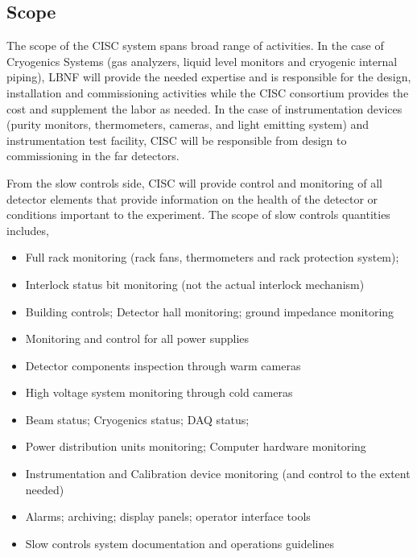 

\subsection{Scope}
\label{sec:fdsp-slow-cryo-scope}


The scope of the CISC system spans broad range of activities. In the
case of Cryogenics Systems (gas analyzers, liquid level monitors and
cryogenic internal piping), LBNF will provide the needed expertise and
is responsible for the design, installation and commissioning activities
while the CISC consortium provides the cost and supplement the labor as
needed. In the case of instrumentation devices (purity monitors,
thermometers, cameras, and light emitting system) and instrumentation
test facility, CISC will be responsible from design to commissioning in
the far detectors.

From the slow controls side, CISC will provide control and monitoring of
all detector elements that provide information on the health of the
detector or conditions important to the experiment. The scope of slow
controls quantities includes,

\begin{itemize}
\item
  Full rack monitoring (rack fans, thermometers and rack protection
  system); 
\item
  Interlock status bit monitoring (not the actual interlock mechanism)
\item
  Building controls; Detector hall monitoring; ground impedance
  monitoring
\item
  Monitoring and control for all power supplies
\item
  Detector components inspection through warm cameras
\item
  High voltage system monitoring through cold cameras
\item
  Beam status; Cryogenics status; DAQ status; 
\item
  Power distribution units monitoring; Computer hardware monitoring
\item
  Instrumentation and Calibration device monitoring (and control to the
  extent needed)
\item
  Alarms; archiving; display panels; operator interface tools 
\item
  Slow controls system documentation and operations guidelines
\end{itemize}

